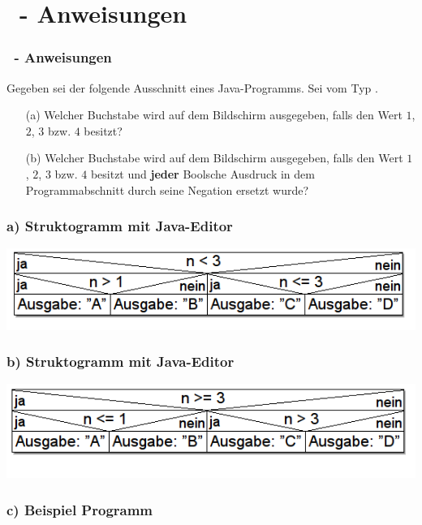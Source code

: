 \def\stitle{\theexercise\ - Anweisungen}
\section{\stitle}
\begin{frame}[t]%
    \frametitle{\stitle}
\medskip

Gegeben sei der folgende Ausschnitt eines Java-Programms. Sei  vom Typ .
\medskip



\begin{itemize}
\item[(a)] Welcher Buchstabe wird auf dem Bildschirm ausgegeben, falls  den Wert $1$, $2$, $3$ bzw. $4$ besitzt?
\item[(b)] Welcher Buchstabe wird auf dem Bildschirm ausgegeben, falls  den Wert $1$, $2$, $3$ bzw. $4$ besitzt und \textbf{jeder} Boolsche Ausdruck in dem Programmabschnitt durch seine Negation ersetzt wurde?
\end{itemize}
\end{frame}


\begin{frame}[fragile]%
 \frametitle{a) Struktogramm mit Java-Editor}%

\begin{center}

\includegraphics[width=1\textwidth]{anweis-1/Bilder/Struktogramm_a}
\end{center}

\end{frame}


\begin{frame}[fragile]%
\frametitle{b) Struktogramm mit Java-Editor}%
\begin{center}

\includegraphics[width=1\textwidth]{anweis-1/Bilder/Struktogramm_b}
\end{center}

\end{frame}


\begin{frame}[fragile]%
 \frametitle{c) Beispiel Programm}%


\end{frame}

